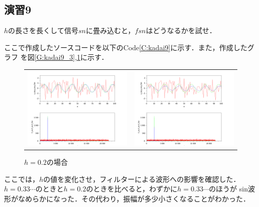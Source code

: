 \documentclass[a4paper,11pt]{jsarticle}
\begin{document}
  \subsection{演習9}
    \begin{screen}
      $h$の長さを長くして信号$sn$に畳み込むと，$fsn$はどうなるかを試せ．
    \end{screen}
    ここで作成したソースコードを以下のCode\ref{C:kadai9}に示す．また，作成したグラフ
  を図\ref{G:kadai9_3},\ref{G:kadai9_5}に示す．
  
  \begin{figure}[H]
    \begin{tabular}{cc}
      \begin{minipage}[t]{0.48\textwidth}
        \centering
        \includegraphics[clip,width=9cm]{picture/kadai9_h3.png}
        \caption{$h = 0.3333の場合$}
        \label{G:kadai9_3}
      \end{minipage} &
      \begin{minipage}[t]{0.48\textwidth}
        \centering
        \includegraphics[clip,width=9cm]{picture/kadai9_h5.png}
        \caption{$h = 0.2$の場合}
        \label{G:kadai9_5}
      \end{minipage}
    \end{tabular}
  \end{figure}
  ここでは，$h$の値を変化させ，フィルターによる波形への影響を確認した．$h=0.33\cdots$のときと$h=0.2$のときを比べると，わずかに$h=0.33\cdots$のほうが
  sin波形がなめらかになった．その代わり，振幅が多少小さくなることがわかった．
\end{document}
